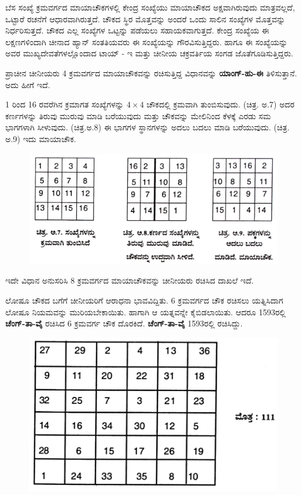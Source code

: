 ಬೆಸ ಸಂಖ್ಯೆ ಕ್ರಮವರ್ಗದ ಮಾಯಾಚೌಕಗಳಲ್ಲಿ ಕೇಂದ್ರ ಸಂಖ್ಯೆಯು ಮಾಯಾಚೌಕದ ಅಕ್ಷವಾಗಿರುವುದು ಮಾತ್ರವಲ್ಲದೆ, ಒಟ್ಟಾರೆ ರಚನೆಗೆ ಆಧಾರವಾಗಿರುತ್ತದೆ. ಚೌಕದ ಸ್ಥಿರ ಮೊತ್ತವನ್ನು ಅಂದರೆ ಒಂದು ಸಾಲಿನ ಸಂಖ್ಯೆಗಳ ಮೊತ್ತವನ್ನು ನಿರ್ಧರಿಸುತ್ತದೆ. ಚೌಕದ ಎಲ್ಲ ಸಂಖ್ಯೆಗಳ ಒಟ್ಟನ್ನು ಪಡೆಯಲು ಸಹಾಯಕವಾಗುತ್ತದೆ. ಕೇಂದ್ರ ಸಂಖ್ಯೆಯ ಈ ಲಕ್ಷಣಗಳಿಂದಾಗಿ ಚೀನಾದ ಹ್ಯಾನ್ ಸಂತತಿಯವರು ಈ ಸಂಖ್ಯೆಯನ್ನು ಗೌರವಿಸುತ್ತಿದ್ದರು. ಹಾಗೂ ಈ ಸಂಖ್ಯೆಯನ್ನು ಅವರ ಮುಖ್ಯದೇವತೆಗಳಲ್ಲೊಂದಾದ ಟಾಯ್​ - ಇ ಮತ್ತು ಚೀನೀಯ ಚಕ್ರವರ್ತಿಯ ಸಂಗಡ ಜೊತೆಗೂಡಿಸುತ್ತಿದ್ದರು.

ಪ್ರಾಚೀನ ಚೀನೀಯರು 4 ಕ್ರಮವರ್ಗದ ಮಾಯಾಚೌಕವನ್ನು ರಚಿಸುತ್ತಿದ್ದ ವಿಧಾನವನ್ನು \textbf{ಯಾಂಗ್-ಹು-ಈ} ತಿಳಿಸುತ್ತಾನೆ. ಅದು ಹೀಗೆ ಇದೆ.

1 ರಿಂದ 16 ರವರೆಗಿನ ಕ್ರಮಾಗತ ಸಂಖ್ಯೆಗಳನ್ನು $4 \times 4$ ಚೌಕದಲ್ಲಿ ಕ್ರಮವಾಗಿ ತುಂಬಿಸುವುದು. (ಚಿತ್ರ. ಅ.7) ಅದರ ಕರ್ಣಗಳನ್ನು ತಿರುವು ಮುರುವು ಮಾಡಿ ಬರೆಯುವುದು ಮತ್ತು ಚೌಕವನ್ನು ಮೇಲಿನಿಂದ ಕೆಳಕ್ಕೆ ಎರಡು ಸಮ ಭಾಗಗಳಾಗಿ ಸೀಳುವುದು. (ಚಿತ್ರ.ಅ.8) ಈ ಭಾಗಗಳ ಸ್ಥಾನಗಳನ್ನು ಅದಲು ಬದಲು ಮಾಡಿ ಬರೆಯುವುದು. (ಚಿತ್ರ. ಅ.9) ಇದು ಮಾಯಾಚೌಕ.
\begin{figure}[H]
\includegraphics{src/figures/chap9/fig9.6.jpg}
\end{figure}

ಇದೇ ವಿಧಾನ ಅನುಸರಿಸಿ 8 ಕ್ರಮವರ್ಗದ ಮಾಯಾಚೌಕವನ್ನು ಚೀನೀಯರು ರಚಿಸಿದ ದಾಖಲೆ ಇದೆ.

ಲೋಷೂ ಚೌಕದ ಬಗೆಗೆ ಚೀನೀಯರಿಗೆ ಆರಾಧನಾ ಭಾವವಿದ್ದಿತು. 6 ಕ್ರಮವರ್ಗದ ಚೌಕ ರಚಿಸಲು ಯತ್ನಿಸಿದಾಗ ಲೋಷೂ ನಿಯಮವನ್ನು ಮುರಿಯಬೇಕಾಯಿತು. ಹಾಗಾಗಿ ಆ ಯತ್ನವನ್ನೇ ಕೈಬಿಡಲಾಯಿತು. ಆದರೂ 1593ರಲ್ಲಿ \textbf{ಚೆಂಗ್-ತಾ-ವೈ} ರಚಿಸಿದ 6 ಕ್ರಮವರ್ಗ ಚೌಕ ದೊರಕಿದೆ. \textbf{ಚೆಂಗ್-ತಾ-ವೈ} 1593ರಲ್ಲಿ ರಚಿಸಿದ್ದು.
\begin{figure}[H]
\includegraphics{src/figures/chap9/fig9.7.jpg}
\end{figure}

